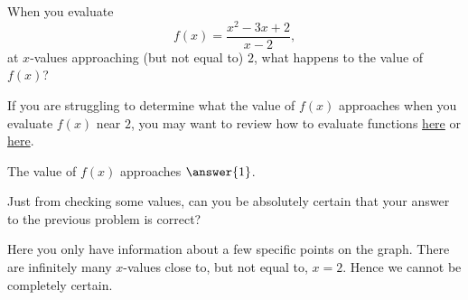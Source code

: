 \documentclass{ximera}
\begin{document}
\begin{problem}
  When you evaluate
  \[
  f(x) = \frac{x^2-3x+2}{x-2},
  \]
  at $x$-values approaching (but not equal to) $2$, what happens to the value of $f(x)$?
  
    \begin{hint}
If you are struggling to determine what the value of $f(x)$ approaches when you evaluate $f(x)$ near $2$, you may want to review how to evaluate functions \href{https://ximera.osu.edu/math160fa17/m160prerequisites/prerequisiteVideos/functionNotation}{here} or \href{https://ximera.osu.edu/math160fa17/m160prerequisites/understandingFunctions/digInForEachInputExactlyOneOutput}{here}.
  \end{hint}
  
  \begin{prompt}
    The value of $f(x)$ approaches $\answer{1}$.
  \end{prompt}
  \begin{problem}
    Just from checking some values, can you be absolutely certain that your
    answer to the previous problem is correct?
    \begin{multipleChoice}
    \end{multipleChoice}
    \begin{feedback}
      Here you only have information about a few specific points on
      the graph.  There are infinitely many $x$-values close to, but
      not equal to, $x = 2$. Hence we cannot be completely certain.
    \end{feedback}
  \end{problem}
\end{problem}


%
\end{document}
